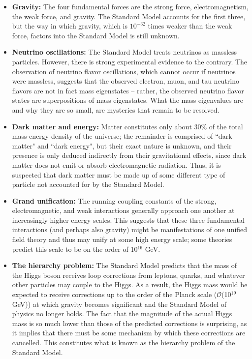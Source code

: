 \begin{itemize}
\item \textbf{Gravity: }The four fundamental forces are the strong force, electromagnetism, the weak force, and gravity. The Standard Model accounts for the first three, but the way in which gravity, which is $10^{-32}$ times weaker than the weak force, factors into the Standard Model is still unknown.
\item \textbf{Neutrino oscillations: }The Standard Model treats neutrinos as massless particles. However, there is strong experimental evidence to the contrary. The observation of neutrino flavor oscillations, which cannot occur if neutrinos were massless, suggests that the observed electron, muon, and tau neutrino flavors are not in fact mass eigenstates -- rather, the observed neutrino flavor states are superpositions of mass eigenstates. What the mass eigenvalues are and why they are so small, are mysteries that remain to be resolved.
\item \textbf{Dark matter and energy: }Matter constitutes only about 30\% of the total mass-energy density of the universe; the remainder is comprised of ``dark matter" and ``dark energy", but their exact nature is unknown, and their presence is only deduced indirectly from their gravitational effects, since dark matter does not emit or absorb electromagnetic radiation. Thus, it is suspected that dark matter must be made up of some different type of particle not accounted for by the Standard Model.
\item \textbf{Grand unification: }The running coupling constants of the strong, electromagnetic, and weak interactions generally approach one another at increasingly higher energy scales. This suggests that these three fundamental interactions (and perhaps also gravity) might be manifestations of one unified field theory and thus may unify at some high energy scale; some theories predict this scale to be on the order of 10$^{16}$ GeV.
\item \textbf{The hierarchy problem: }The Standard Model predicts that the mass of the Higgs boson receives loop corrections from leptons, quarks, and whatever other particles may couple to the Higgs. As a result, the Higgs mass would be expected to receive corrections up to the order of the Planck scale ($\mathcal{O}$(10$^{19}$ GeV)) at which gravity becomes significant and the Standard Model of physics no longer holds. The fact that the magnitude of the actual Higgs mass is so much lower than those of the predicted corrections is surprising, as it implies that there must be some mechanism by which these corrections are cancelled. This constitutes what is known as the hierarchy problem of the Standard Model.
\end{itemize}

